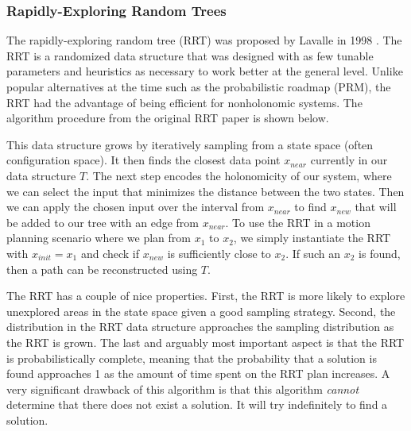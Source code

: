 \subsubsection{Rapidly-Exploring Random Trees} \label{planning:rrt}
The rapidly-exploring random tree (RRT) was proposed by Lavalle in 1998 . The RRT is a randomized data structure that was designed with as few tunable parameters and heuristics as necessary to work better at the general level. Unlike popular alternatives at the time such as the probabilistic roadmap (PRM), the RRT had the advantage of being efficient for nonholonomic systems. The algorithm procedure from the original RRT paper is shown below.

{}

This data structure grows by iteratively sampling from a state space (often configuration space). It then finds the closest data point $x_{near}$ currently in our data structure $T$. The next step encodes the holonomicity of our system, where we can select the input that minimizes the distance between the two states. Then we can apply the chosen input over the interval from $x_{near}$ to find $x_{new}$ that will be added to our tree with an edge from $x_{near}$. To use the RRT in a motion planning scenario where we plan from $x_1$ to $x_2$, we simply instantiate the RRT with $x_{init} = x_1$ and check if $x_{new}$ is sufficiently close to $x_2$. If such an $x_2$ is found, then a path can be reconstructed using $T$.

The RRT has a couple of nice properties. First, the RRT is more likely to explore unexplored areas in the state space given a good sampling strategy. Second, the distribution in the RRT data structure approaches the sampling distribution as the RRT is grown. The last and arguably most important aspect is that the RRT is probabilistically complete, meaning that the probability that a solution is found approaches 1 as the amount of time spent on the RRT plan increases. A very significant drawback of this algorithm is that this algorithm \emph{cannot} determine that there does not exist a solution. It will try indefinitely to find a solution.

